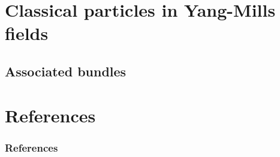 \documentclass [xcolor=svgnames, t] {beamer}
\theoremstyle{definition}
\theoremstyle{plain}
\theoremstyle{remark}
\begin{document}
\section[Yang-Mills]{Classical particles in Yang-Mills fields}%
\label{sec:classical_particles_in_yang_mills_fields}
\subsection{Associated bundles}%
\label{sub:associated_bundles}



\section{References}
\begin{frame} [allowframebreaks]\frametitle{References}
        
	\nocite{*}
        
\end{frame}
\end{document}
